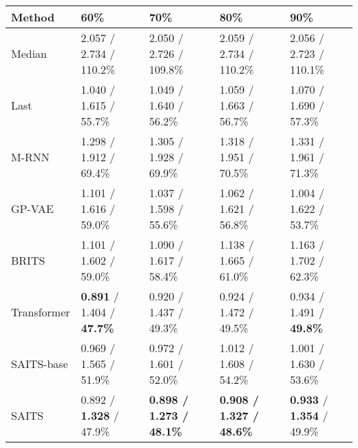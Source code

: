 \documentclass{article}
\begin{document}
\begin{table}[!htb]
\begin{minipage}{1\textwidth}
{\begin{tabular}{p{60pt}<{\centering}|p{90pt}<{\centering}|p{90pt}<{\centering}|p{90pt}<{\centering}|p{90pt}<{\centering}}
				\toprule
				Method         & 60\%                    & 70\%                    & 80\%                     & 90\%                    \\
				\midrule
				Median         & 2.057 / 2.734 / 110.2\% & 2.050 / 2.726 / 109.8\% & 2.059 / 2.734 / 110.2\%   & 2.056 / 2.723 / 110.1\% \\
				\midrule
				Last          & 1.040 / 1.615 / 55.7\%  & 1.049 / 1.640 / 56.2\%  & 1.059 / 1.663 / 56.7\%    & 1.070 / 1.690 / 57.3\% \\
				\midrule
				M-RNN         & 1.298 / 1.912 / 69.4\%  & 1.305 / 1.928 / 69.9\%   & 1.318 / 1.951 / 70.5\%    & 1.331 / 1.961 / 71.3\%  \\
				\midrule
				GP-VAE         & 1.101 / 1.616 / 59.0\%  & 1.037 / 1.598 / 55.6\%  & 1.062 / 1.621 / 56.8\%    & 1.004 / 1.622 / 53.7\%     \\
				\midrule
				BRITS          & 1.101 / 1.602 / 59.0\%   & 1.090 / 1.617 / 58.4\%  & 1.138 / 1.665 / 61.0\%    & 1.163 / 1.702 / 62.3\%  \\
				\midrule
				Transformer    & \textbf{0.891} / 1.404 / \textbf{47.7\%}  & 0.920 / 1.437 / 49.3\%  & 0.924 / 1.472 / 49.5\%    & 0.934 / 1.491 / \textbf{49.8\%}  \\
				\midrule
				SAITS-base  & 0.969 / 1.565 / 51.9\%  & 0.972 / 1.601 / 52.0\% & 1.012 / 1.608 / 54.2\%     & 1.001 / 1.630 / 53.6\%\vspace{0.5em} \\ 
				SAITS          & 0.892 / \textbf{1.328} / 47.9\%  & \textbf{0.898 / 1.273 / 48.1\%}  &\textbf{0.908 / 1.327 / 48.6\%}& \textbf{0.933} / \textbf{1.354} / 49.9\%  \\
				\bottomrule
			\end{tabular}
		}
	\end{minipage}
\end{table}
\end{document}
